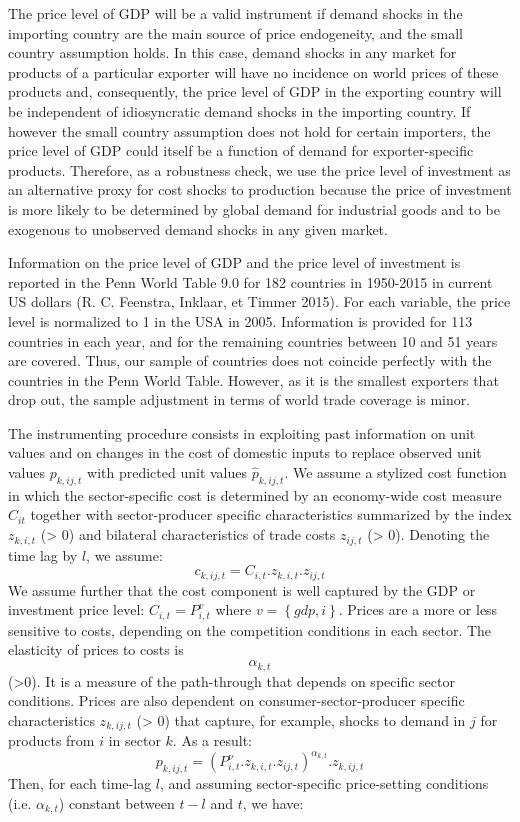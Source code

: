 \documentclass[12pt,twoside,a4paper,notitlepage]{article}
\begin{document}
{The price level of GDP will be a valid instrument if demand shocks in the importing country are the main source of price endogeneity, and the small country assumption holds.
In this case, demand shocks in any market for products of a particular exporter will have no incidence on world prices of these products and, consequently, the price level of GDP in the exporting country will be independent of idiosyncratic demand shocks in the importing country.
If however the small country assumption does not hold for certain importers, the price level of GDP could itself be a function of demand for exporter-specific products.
Therefore, as a robustness check, we use the price level of investment as an alternative proxy for cost shocks to production because the price of investment is more likely to be determined by global demand for industrial goods and to be exogenous to unobserved demand shocks in any given market.


Information on the price level of GDP and the price level of investment is reported in the Penn World Table 9.0 for 182 countries in 1950-2015 in current US dollars (R.
C.
Feenstra, Inklaar, et Timmer 2015).
For each variable, the price level is normalized to 1 in the USA in 2005.
Information is provided for 113 countries in each year, and for the remaining countries between 10 and 51 years are covered.
Thus, our sample of countries does not coincide perfectly with the countries in the Penn World Table.
However, as it is the smallest exporters that drop out, the sample adjustment in terms of world trade coverage is minor.

The instrumenting procedure consists in exploiting past information on unit values and on changes in the cost of domestic inputs to replace observed unit values ${{p}_{k,ij,t}}$ with predicted unit values ${{\hat{p}}_{k,ij,t}}$.
We assume a stylized cost function in which the sector-specific cost is determined by an economy-wide cost measure ${{C}_{it}}$ together with sector-producer specific characteristics summarized by the index ${{z}_{k,i,t}}$ (> 0) and bilateral characteristics of trade costs ${{z}_{ij,t}}$ (> 0).
Denoting the time lag by $l$, we assume:
\[{{c}_{k,ij,t}}={{C}_{i,t}}.{{z}_{k,i,t}}.{{z}_{ij,t}}\] 
We assume further that the cost component is well captured by the GDP or investment price level: ${{C}_{i,t}}=P_{i,t}^{v}$ where $v=\left\{ gdp,i \right\}$.
Prices are a more or less sensitive to costs, depending on the competition conditions in each sector.
The elasticity of prices to costs is \[{{\alpha }_{k,t}}\] (>0).
It is a measure of the path-through that depends on specific sector conditions.
Prices are also dependent on consumer-sector-producer specific characteristics ${{z}_{k,ij,t}}$ (> 0) that capture, for example, shocks to demand in $j$ for products from $i$ in sector $k$.
As a result:
\[{{p}_{k,ij,t}}={{\left( P_{i,t}^{\nu }.{{z}_{k,i,t}}.{{z}_{ij,t}} \right)}^{{{\alpha }_{k,t}}}}.{{z}_{k,ij,t}}\]
 Then, for each time-lag $l$, and assuming sector-specific price-setting conditions (i.e.
${{\alpha }_{k,t}}$) constant between $t-l$ and $t$, we have:

}
\end{document}
